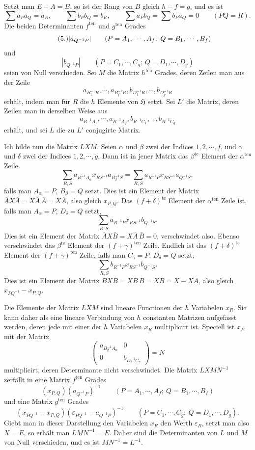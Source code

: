 \documentclass[11pt]{article}
\newcommand{\Hgr}{\mathfrak{H}}
\newcommand{\eps}{\varepsilon}
\newcommand{\ten}{\mathrm{ten}}
\newcommand{\te}{\mathrm{te}}
\begin{document}
Setzt man $E-A=B$, so ist der Rang von $B$ gleich $h-f=g$, und es ist
\[
\sum a_Pa_Q=a_R,
\qquad
\sum b_Pb_Q=b_R,
\qquad
\sum a_Pb_Q=\sum b_Pa_Q=0\qquad(PQ=R).
\]
Die beiden Determinanten $f^{\ten}$ und $g^{\ten}$ Grades
\begin{equation}\tag{5.}
|a_{Q^{-1}P}|\\[-0.5em]
\qquad(P=A_1,\cdots,A_f;\ Q=B_1,\cdots,B_f)
\end{equation}
und
\[
|b_{Q^{-1}P}|
\qquad(P=C_1,\cdots,C_g;\ Q=D_1,\cdots,D_g)
\]
seien von Null verschieden. Sei $M$ die Matrix $h^{\ten}$ Grades, deren Zeilen man aus der Zeile
\[
a_{B_1^{-1}R},\cdots,a_{B_f^{-1}R},b_{D_1^{-1}R},\cdots,b_{D_g^{-1}R}
\]
erhält, indem man für $R$ die $h$ Elemente von $\Hgr$ setzt. Sei $L'$ die Matrix, deren Zeilen man in derselben Weise aus
\[
a_{R^{-1}A_1},\cdots,a_{R^{-1}A_f},b_{R^{-1}C_1},\cdots,b_{R^{-1}C_g}
\]
erhält, und sei $L$ die zu $L'$ conjugirte Matrix.

Ich bilde nun die Matrix $LXM$. Seien $\alpha$ und $\beta$ zwei der Indices $1,2,\cdots,f$, und $\gamma$ und $\delta$ zwei der Indices $1,2,\cdots,g$. Dann ist in jener Matrix das $\beta^{\te}$ Element der $\alpha^{\ten}$ Zeile
\[
\sum_{R,S}a_{R^{-1}A_\alpha}x_{RS^{-1}}a_{B_\beta^{-1}S}
=\sum_{R,S}a_{R^{-1}P}x_{RS^{-1}}a_{Q^{-1}S},
\]
falls man $A_\alpha=P$, $B_\beta=Q$ setzt. Dies ist ein Element der Matrix $\overline{A}X\overline{A}=X\overline{A}\,\overline{A}=X\overline{A}$, also gleich $x_{P,Q}$. Das $(f+\delta)^{\te}$ Element der $\alpha^{\ten}$ Zeile ist, falls man $A_\alpha=P$, $D_\delta=Q$ setzt,
\[
\sum_{R,S}a_{R^{-1}P}x_{RS^{-1}}b_{Q^{-1}S}.
\]
Dies ist ein Element der Matrix $\overline{A}X\overline{B}=X\overline{A}\,\overline{B}=0$, verschwindet also. Ebenso verschwindet das $\beta^{\te}$ Element der $(f+\gamma)^{\ten}$ Zeile. Endlich ist das $(f+\delta)^{\te}$ Element der $(f+\gamma)^{\ten}$ Zeile, falls man $C_\gamma=P$, $D_\delta=Q$ setzt,
\[
\sum_{R,S}b_{R^{-1}P}x_{RS^{-1}}b_{Q^{-1}S}.
\]
Dies ist ein Element der Matrix $\overline{B}X\overline{B}=X\overline{B}\,\overline{B}=X\overline{B}=X-X\overline{A}$, also gleich $x_{PQ^{-1}}-x_{P,Q}$.

Die Elemente der Matrix $LXM$ sind lineare Functionen der $h$ Variabelen $x_R$. Sie kann daher als eine lineare Verbindung von $h$ constanten Matrizen aufgefasst werden, deren jede mit einer der $h$ Variabelen $x_R$ multiplicirt ist. Speciell ist $x_E$ mit der Matrix
\[
\begin{pmatrix}
a_{B_\beta^{-1}A_\alpha}&0\\
0&b_{D_\delta^{-1}C_\gamma}
\end{pmatrix}=N
\]
multiplicirt, deren Determinante nicht verschwindet. Die Matrix $LXMN^{-1}$ zerfällt in eine Matrix $f^{\ten}$ Grades
\[
(x_{P,Q})(a_{Q^{-1}P})^{-1}
\qquad(P=A_1,\cdots,A_f;\ Q=B_1,\cdots,B_f)
\]
und eine Matrix $g^{\ten}$ Grades
\[
(x_{PQ^{-1}}-x_{P,Q})(\eps_{PQ^{-1}}-a_{Q^{-1}P})^{-1}
\qquad(P=C_1,\cdots,C_g;\ Q=D_1,\cdots,D_g).
\]
Giebt man in dieser Darstellung den Variabelen $x_R$ den Werth $\eps_R$, setzt man also $X=E$, so erhält man $LMN^{-1}=E$. Daher sind die Determinanten von $L$ und $M$ von Null verschieden, und es ist $MN^{-1}=L^{-1}$.
\end{document}
